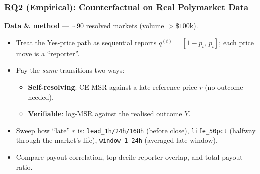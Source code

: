 \documentclass[
	11pt, %
]{beamer}
\begin{document}
\begin{frame}
	\frametitle{RQ2 (Empirical): Counterfactual on Real Polymarket Data}

	\textbf{Data \& method} --- $\sim$90 resolved markets (volume $> \$100$k).
	\begin{itemize}
		\item Treat the Yes-price path as sequential reports $q^{(t)}=[1-p_t,\,p_t]$; each price move is a ``reporter''.
		\item Pay the \emph{same} transitions two ways:
		\begin{itemize}
			\item \textbf{Self-resolving}: CE-MSR against a late reference price $r$ (no outcome needed).
			\item \textbf{Verifiable}: log-MSR against the realised outcome $Y$.
		\end{itemize}
		\item Sweep how ``late'' $r$ is: \texttt{lead\_1h/24h/168h} (before close), \texttt{life\_50pct} (halfway through the market's life), \texttt{window\_1-24h} (averaged late window).
		\item Compare payout correlation, top-decile reporter overlap, and total payout ratio.
	\end{itemize}
\end{frame}

\end{document}
